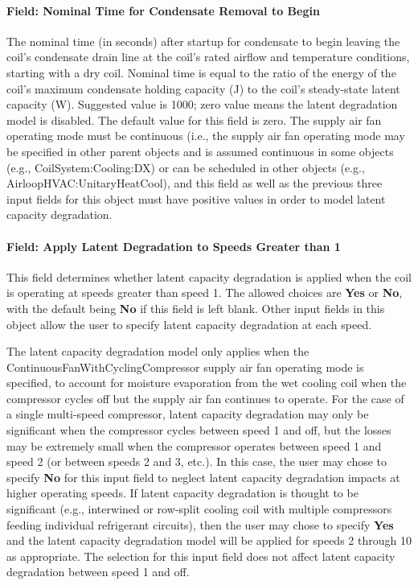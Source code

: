 \paragraph{Field: Nominal Time for Condensate Removal to Begin}\label{field-nominal-time-for-condensate-removal-to-begin}

The nominal time (in seconds) after startup for condensate to begin leaving the coil's condensate drain line at the coil's rated airflow and temperature conditions, starting with a dry coil. Nominal time is equal to the ratio of the energy of the coil's maximum condensate holding capacity (J) to the coil's steady-state latent capacity (W). Suggested value is 1000; zero value means the latent degradation model is disabled. The default value for this field is zero. The supply air fan operating mode must be continuous (i.e., the supply air fan operating mode may be specified in other parent objects and is assumed continuous in some objects (e.g., CoilSystem:Cooling:DX) or can be scheduled in other objects (e.g., AirloopHVAC:UnitaryHeatCool), and this field as well as the previous three input fields for this object must have positive values in order to model latent capacity degradation.

\paragraph{Field: Apply Latent Degradation to Speeds Greater than 1}\label{field-apply-latent-degradation-to-speeds-greater-than-1}

This field determines whether latent capacity degradation is applied when the coil is operating at speeds greater than speed 1. The allowed choices are \textbf{Yes} or \textbf{No}, with the default being \textbf{No} if this field is left blank. Other input fields in this object allow the user to specify latent capacity degradation at each speed.

The latent capacity degradation model only applies when the ContinuousFanWithCyclingCompressor supply air fan operating mode is specified, to account for moisture evaporation from the wet cooling coil when the compressor cycles off but the supply air fan continues to operate. For the case of a single multi-speed compressor, latent capacity degradation may only be significant when the compressor cycles between speed 1 and off, but the losses may be extremely small when the compressor operates between speed 1 and speed 2 (or between speeds 2 and 3, etc.). In this case, the user may chose to specify \textbf{No} for this input field to neglect latent capacity degradation impacts at higher operating speeds. If latent capacity degradation is thought to be significant (e.g., interwined or row-split cooling coil with multiple compressors feeding individual refrigerant circuits), then the user may chose to specify \textbf{Yes} and the latent capacity degradation model will be applied for speeds 2 through 10 as appropriate. The selection for this input field does not affect latent capacity degradation between speed 1 and off.

